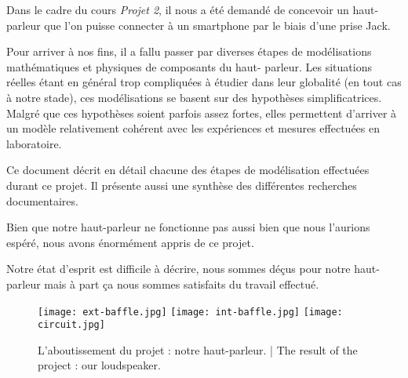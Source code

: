 

\begin{abstract-fr}
Dans le cadre du cours \textit{Projet 2}, il nous a été demandé
de concevoir un haut-parleur que l'on puisse connecter à un smartphone
par le biais d'une prise Jack.

Pour arriver à nos fins, il a fallu passer par diverses étapes
de modélisations mathématiques et physiques de composants du haut-
parleur. Les situations réelles étant en général trop compliquées à étudier
dans leur globalité (en tout cas à notre stade), ces modélisations se basent sur des 
hypothèses simplificatrices. Malgré que ces hypothèses soient parfois assez fortes, 
elles permettent d'arriver à un modèle relativement cohérent avec les expériences et
mesures effectuées en laboratoire.

Ce document décrit en détail chacune des étapes de modélisation effectuées durant
ce projet. Il présente aussi une synthèse des différentes recherches documentaires.

Bien que notre haut-parleur ne fonctionne pas aussi bien que nous l'aurions
espéré, nous avons énormément appris de ce projet.

Notre état d'esprit est difficile à décrire, nous sommes déçus pour notre haut-parleur
mais à part ça nous sommes satisfaits du travail effectué.

\begin{figure}[!htb]
	\centering
	\texttt{[image: ext-baffle.jpg]}
	\texttt{[image: int-baffle.jpg]}
	\texttt{[image: circuit.jpg]}
	\caption{L'aboutissement du projet : notre haut-parleur. | The result of the project : our loudspeaker.}
\end{figure}

\end{abstract-fr}


